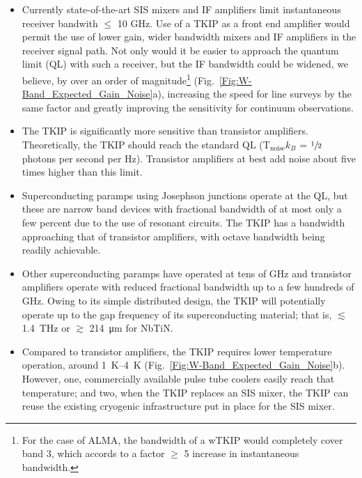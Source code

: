 \begin{itemize}
\item Currently state-of-the-art SIS mixers and IF amplifiers limit instantaneous receiver bandwith $\le$ 10 GHz. Use of a TKIP as a front end amplifier would permit the use of lower gain, wider bandwidth mixers and IF amplifiers in the receiver signal path.  Not only would it be easier to approach the quantum limit (QL) with such a receiver, but the IF bandwidth could be widened, we believe, by over an order of magnitude\footnote{For the case of ALMA, the bandwidth of a wTKIP would completely cover band 3, which accords to a factor $\ge$ 5 increase in instantaneous bandwidth.} (Fig.~\ref{Fig:W-Band_Expected_Gain_Noise}a), increasing the speed for line surveys by the same factor and greatly improving the sensitivity for continuum observations.

\item The TKIP is significantly more sensitive than transistor amplifiers. Theoretically, the TKIP should reach the standard QL (T$_\text{noise} k_B$ = $\sfrac{1}{2}$ photons per second per Hz). Transistor amplifiers at best add noise about five times higher than this limit.

\item Superconducting paramps using Josephson junctions operate at the QL, but these are narrow band devices with fractional bandwidth of at most only a few percent due to the use of resonant circuits. The TKIP has a bandwidth approaching that of transistor amplifiers, with octave bandwidth being readily achievable.

\item Other superconducting paramps have operated at tens of GHz and transistor amplifiers operate with reduced fractional bandwidth up to a few hundreds of GHz. Owing to its simple distributed design, the TKIP will potentially operate up to the gap frequency of its superconducting material; that is,  $\lesssim$ \SI{1.4}{THz} or $\gtrsim$ \SI{214}{\micro \meter} for NbTiN.

\item Compared to transistor amplifiers, the TKIP requires lower temperature operation, around \SIrange{1}{4}{\kelvin} (Fig.~\ref{Fig:W-Band_Expected_Gain_Noise}b). However, one, commercially available pulse tube coolers easily reach that temperature; and two, when the TKIP replaces an SIS mixer, the TKIP can reuse the existing cryogenic infrastructure put in place for the SIS mixer.
\end{itemize}

